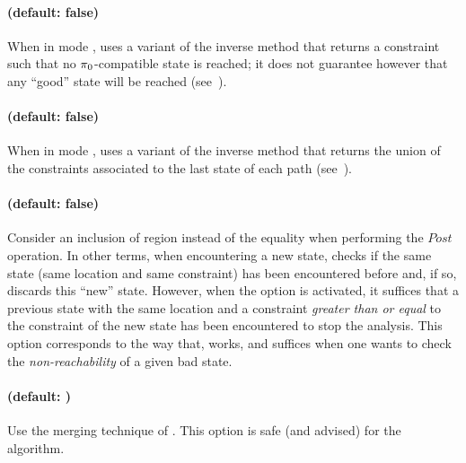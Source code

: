 \paragraph{ (default: false)}
When in mode ,
uses a variant of the inverse method that returns a constraint such that no $\pi_0$-compatible state is reached; it does not guarantee however that any ``good'' state will be reached (see~\cite{AS13}).



\paragraph{ (default: false)}
When in mode ,
uses a variant of the inverse method that returns the union of the constraints associated to the last state of each path (see~\cite{AS13}).


\paragraph{ (default: false)}
Consider an inclusion of region instead of the equality when performing the $\textit{Post}$ operation.
In other terms, when encountering a new state, \imitator{} checks if the same state (same location and same constraint) has been encountered before and, if so, discards this ``new'' state.
However, when the  option is activated, it suffices that a previous state with the same location and a constraint \emph{greater than or equal} to the constraint of the new state has been encountered to stop the analysis.
This option corresponds to the way that, \eg{} \hytech{} works, and suffices when one wants to check the \emph{non-reachability} of a given bad state.


\paragraph{ (default: )}
Use the merging technique of \cite{AFS13atva}.
This option is safe (and advised) for the \EFsynth{} algorithm.

